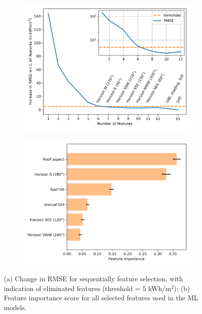 \begin{figure}[b]
\centering
\begin{subfigure}{.49\textwidth}
  \centering
  \includegraphics[width=\linewidth]{images/Figs/ftr_selection_topdown_reduced_run1_w_excluded.png}
  \subcaption{}
  \label{fig:chile_RFE}
\end{subfigure}
\begin{subfigure}{.49\textwidth}
  \centering
  \includegraphics[width=\linewidth]{images/Figs/Feature_importance_selFtrs_mean_10k.png}  
  \subcaption{}
    \label{fig:chile_FtrImp}
\end{subfigure}
\caption{(a) Change in RMSE for sequentially feature selection, with indication of eliminated features (threshold = 5 kWh/m$^2$); (b) Feature importance score for all selected features used in the ML models.}
\label{fig:chile_ftrs}
\end{figure}


